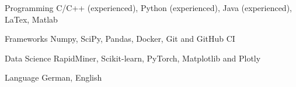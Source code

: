 

\begin{cvskills}

  \cvskill
    {Programming} %
    {C/C++ (experienced), Python (experienced), Java (experienced), LaTex, Matlab } %

  \cvskill
    {Frameworks} %
    {Numpy, SciPy, Pandas, Docker, Git and GitHub CI} %

  \cvskill
    {Data Science} %
    {RapidMiner, Scikit-learn, PyTorch, Matplotlib and Plotly} %

  \cvskill
    {Language} %
    {German, English} %

\end{cvskills}
